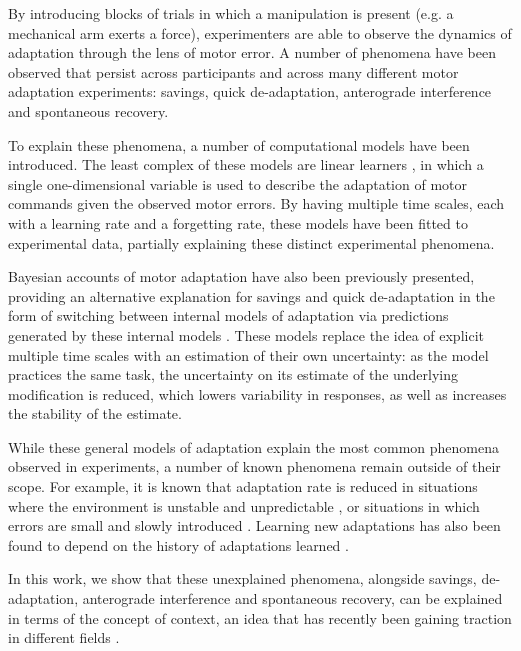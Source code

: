 \documentclass[a4paper,doc,floatsintext,natbib]{apa6}
\begin{document}
By introducing blocks of trials in which a manipulation is present (e.g. a mechanical arm exerts a force), experimenters are able to observe the dynamics of adaptation through the lens of motor error. A number of phenomena have been observed that persist across participants and across many different motor adaptation experiments: savings, quick de-adaptation, anterograde interference and spontaneous recovery.

To explain these phenomena, a number of computational models have been introduced. The least complex of these models are linear learners \citep[e.g.][]{Smith_Interacting_2006,Forano_Timescales_2020,Scheidt_Learning_2001}, in which a single one-dimensional variable is used to describe the adaptation of motor commands given the observed motor errors. By having multiple time scales, each with a learning rate and a forgetting rate, these models have been fitted to experimental data, partially explaining these distinct experimental phenomena.

Bayesian accounts of motor adaptation have also been previously presented, providing an alternative explanation for savings and quick de-adaptation in the form of switching between internal models of adaptation via predictions generated by these internal models \citep{Kording_Bayesian_2004,Oh_Minimizing_2019}. These models replace the idea of explicit multiple time scales with an estimation of their own uncertainty: as the model practices the same task, the uncertainty on its estimate of the underlying modification is reduced, which lowers variability in responses, as well as increases the stability of the estimate.

While these general models of adaptation explain the most common phenomena observed in experiments, a number of known phenomena remain outside of their scope. For example, it is known that adaptation rate is reduced in situations where the environment is unstable and unpredictable \citep{Herzfeld_memory_2014}, or situations in which errors are small \citep{Marko_Sensitivity_2012} and slowly introduced \citep{Huang_Persistence_2009}. Learning new adaptations has also been found to depend on the history of adaptations learned \citep{Vaswani_Decay_2013}.

In this work, we show that these unexplained phenomena, alongside savings, de-adaptation, anterograde interference and spontaneous recovery, can be explained in terms of the concept of context, an idea that has recently been gaining traction in different fields \cite[e.g.][]{Sanders_Hippocampal_2020,Hunter_Contextsensitive_2021}.
\end{document}
